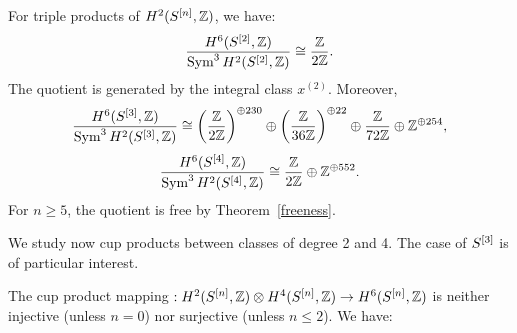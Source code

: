 \begin{proposition} For triple products of $H^2(S^{[n]},\mathbb{Z})$, we have:
$$
\frac{H^6(S^{[2]},\mathbb{Z})}{\operatorname{Sym}^3 H^2(S^{[2]},\mathbb{Z})} \cong 
\frac{\mathbb{Z}}{2\mathbb{Z}}.
$$
The quotient is generated by the integral class $x^{(2)}$. Moreover,
$$
\frac{H^6(S^{[3]},\mathbb{Z})}{\operatorname{Sym}^3 H^2(S^{[3]},\mathbb{Z})} \cong  \left(\frac{\mathbb{Z}}{2\mathbb{Z}}\right)^{\oplus 230}\oplus \left(\frac{\mathbb{Z}}{36\mathbb{Z}}\right)^{\oplus 22}\oplus \frac{\mathbb{Z}}{72\mathbb{Z}} \oplus \mathbb{Z}^{\oplus 254},
$$
$$
\frac{H^6(S^{[4]},\mathbb{Z})}{\operatorname{Sym}^3 H^2(S^{[4]},\mathbb{Z})} \cong  \frac{\mathbb{Z}}{2\mathbb{Z}} \oplus \mathbb{Z}^{\oplus 552}.
$$
For $n\geq 5$, the quotient is free by Theorem~\ref{freeness}.
\end{proposition}
We study now cup products between classes of degree 2 and 4. The case of $S^{[3]}$ is of particular interest.
\begin{proposition} \label{p24}The cup product mapping $ : H^2(S^{[n]},\mathbb{Z})\otimes H^4(S^{[n]},\mathbb{Z}) \rightarrow H^6(S^{[n]},\mathbb{Z}) $ is neither injective (unless $n=0$) nor surjective (unless $n\leq 2$). We have:


\end{proposition}

